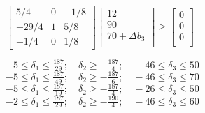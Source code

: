 \documentclass[../main.tex]{subfiles}
\begin{document}
\begin{questions}
\begin{solution}
$\begin{bmatrix}
        5/4&0&-1/8   \\[2mm]
        - 29/4&1&5/8\\[2mm]  
        - 1/4&0&1/8   
\end{bmatrix}
\begin{bmatrix}
  12 \\[2mm] 90  \\[2mm] 70 + \Delta b_3\\
\end{bmatrix}
\geq
\begin{bmatrix}
  0 \\[2mm] 0 \\[2mm] 0\\
\end{bmatrix}
$
\end{solution}

\begin{checkboxes}
  \correctchoice  $ -5 \leq \delta_1 \leq \frac{187}{29};\quad \delta_2 \geq -\frac{187}{4};\quad -46 \leq \delta_3 \leq 50 $
  \choice $-5 \leq \delta_1 \leq \frac{187}{49};\quad  \delta_2 \geq -\frac{187}{6};\quad -46 \leq \delta_3 \leq 70 $
  \choice $-5 \leq \delta_1 \leq \frac{187}{19};\quad  \delta_2 \geq -\frac{187}{4};\quad -26 \leq \delta_3 \leq 50 $
  \choice $-2 \leq \delta_1 \leq \frac{187}{29};\quad  \delta_2 \geq -\frac{190}{4};\quad -46 \leq \delta_3 \leq 60 $
\end{checkboxes}


\end{questions}
\end{document}
